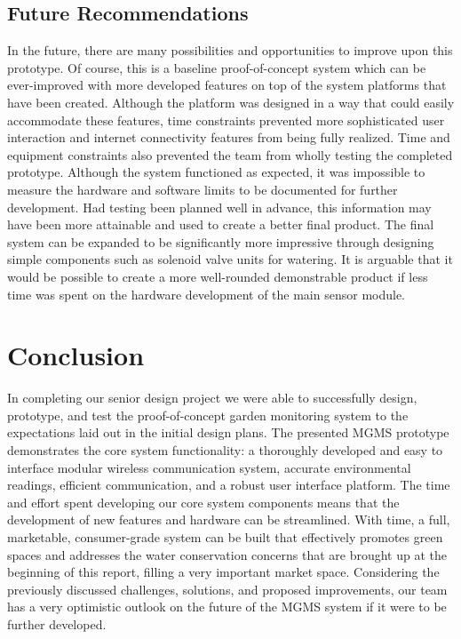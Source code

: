 \documentclass{report}
\begin{document}
\section{Future Recommendations}
In the future, there are many possibilities and opportunities to improve upon this prototype. Of course, this is a baseline proof-of-concept system which can be ever-improved with more developed features on top of the system platforms that have been created. Although the platform was designed in a way that could easily accommodate these features, time constraints prevented more sophisticated user interaction and internet connectivity features from being fully realized. Time and equipment constraints also prevented the team from wholly testing the completed prototype. Although the system functioned as expected, it was impossible to measure the hardware and software limits to be documented for further development. Had testing been planned well in advance, this information may have been more attainable and used to create a better final product. The final system can be expanded to be significantly more impressive through designing simple components such as solenoid valve units for watering. It is arguable that it would be possible to create a more well-rounded demonstrable product if less time was spent on the hardware development of the main sensor module.

\chapter{Conclusion}
In completing our senior design project we were able to successfully design, prototype, and test the proof-of-concept garden monitoring system to the expectations laid out in the initial design plans. The presented MGMS prototype demonstrates the core system functionality: a thoroughly developed and easy to interface modular wireless communication system, accurate environmental readings, efficient communication, and a robust user interface platform. The time and effort spent developing our core system components means that the development of new features and hardware can be streamlined. With time, a full, marketable, consumer-grade system can be built that effectively promotes green spaces and addresses the water conservation concerns that are brought up at the beginning of this report, filling a very important market space. Considering the previously discussed challenges, solutions, and proposed improvements, our team has a very optimistic outlook on the future of the MGMS system if it were to be further developed.\\\\
\end{document}
